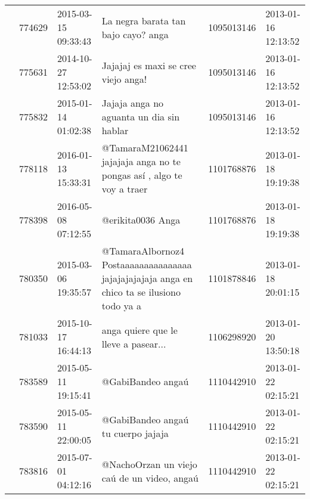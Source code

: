 \begin{tabular}{llllrl}
           & 774629  & 2015-03-15 09:33:43 &                                                                                                          La negra barata tan bajo cayo? anga &  1095013146 & 2013-01-16 12:13:52 \\
           & 775631  & 2014-10-27 12:53:02 &                                                                                                          Jajajaj es maxi se cree viejo anga! &  1095013146 & 2013-01-16 12:13:52 \\
           & 775832  & 2015-01-14 01:02:38 &                                                                                                     Jajaja anga no aguanta un dia sin hablar &  1095013146 & 2013-01-16 12:13:52 \\
           & 778118  & 2016-01-13 15:33:31 &                                                                      @TamaraM21062441 jajajaja anga no te pongas así , algo te voy a traer 🙈 &  1101768876 & 2013-01-18 19:19:38 \\
           & 778398  & 2016-05-08 07:12:55 &                                                                                                                            @erikita0036 Anga &  1101768876 & 2013-01-18 19:19:38 \\
           & 780350  & 2015-03-06 19:35:57 &                                                   @TamaraAlbornoz4 Postaaaaaaaaaaaaaaa jajajajajajaja anga en chico ta se ilusiono todo ya a &  1101878846 & 2013-01-18 20:01:15 \\
           & 781033  & 2015-10-17 16:44:13 &                                                                                                         anga quiere que le lleve a pasear... &  1106298920 & 2013-01-20 13:50:18 \\
           & 783589  & 2015-05-11 19:15:41 &                                                                                                                            @GabiBandeo angaú &  1110442910 & 2013-01-22 02:15:21 \\
           & 783590  & 2015-05-11 22:00:05 &                                                                                                           @GabiBandeo angaú tu cuerpo jajaja &  1110442910 & 2013-01-22 02:15:21 \\
           & 783816  & 2015-07-01 04:12:16 &                                                                                                  @NachoOrzan un viejo caú de un video, angaú &  1110442910 & 2013-01-22 02:15:21 \\

\end{tabular}
